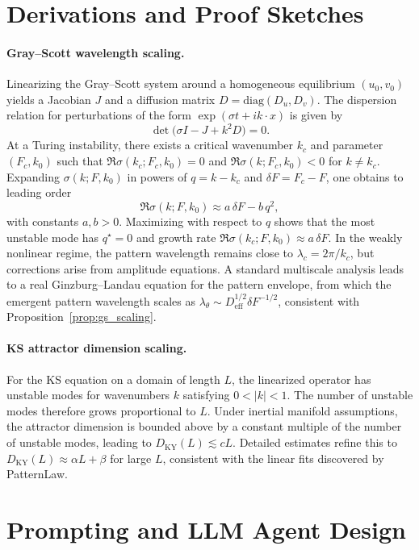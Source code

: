 \documentclass{article}
\theoremstyle{plain}
\theoremstyle{definition}
\theoremstyle{remark}
\begin{document}
\section{Derivations and Proof Sketches}
\label{app:derivations}

\paragraph{Gray--Scott wavelength scaling.}
Linearizing the Gray--Scott system around a homogeneous equilibrium $(u_0,v_0)$ yields a Jacobian $J$ and a diffusion matrix $D=\mathrm{diag}(D_u,D_v)$. The dispersion relation for perturbations of the form $\exp(\sigma t + i k\cdot x)$ is given by
\[
\det\bigl(\sigma I - J + k^2 D\bigr) = 0.
\]
At a Turing instability, there exists a critical wavenumber $k_c$ and parameter $(F_c,k_0)$ such that $\Re \sigma(k_c;F_c,k_0)=0$ and $\Re \sigma(k;F_c,k_0)<0$ for $k\ne k_c$. Expanding $\sigma(k;F,k_0)$ in powers of $q=k-k_c$ and $\delta F = F_c-F$, one obtains to leading order
\[
\Re \sigma(k;F,k_0) \approx a\,\delta F - b\,q^2,
\]
with constants $a,b>0$. Maximizing with respect to $q$ shows that the most unstable mode has $q^\star=0$ and growth rate $\Re \sigma(k_c;F,k_0)\approx a\,\delta F$. In the weakly nonlinear regime, the pattern wavelength remains close to $\lambda_c=2\pi/k_c$, but corrections arise from amplitude equations. A standard multiscale analysis leads to a real Ginzburg--Landau equation for the pattern envelope, from which the emergent pattern wavelength scales as $\lambda_\theta \sim D_{\mathrm{eff}}^{1/2}\delta F^{-1/2}$, consistent with Proposition~\ref{prop:gs_scaling}.

\paragraph{KS attractor dimension scaling.}
For the KS equation on a domain of length $L$, the linearized operator has unstable modes for wavenumbers $k$ satisfying $0<|k|<1$. The number of unstable modes therefore grows proportional to $L$. Under inertial manifold assumptions, the attractor dimension is bounded above by a constant multiple of the number of unstable modes, leading to $D_{\mathrm{KY}}(L)\lesssim cL$. Detailed estimates refine this to $D_{\mathrm{KY}}(L)\approx \alpha L + \beta$ for large $L$, consistent with the linear fits discovered by PatternLaw.

\section{Prompting and LLM Agent Design}
\label{app:prompts}
\end{document}
